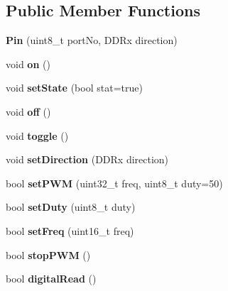 \subsection*{Public Member Functions}
\begin{DoxyCompactItemize}
\item 
\mbox{\label{classPin_a5a77b8b0c99771c11582f0a011496e6b}} 
{\bfseries Pin} (uint8\+\_\+t port\+No, D\+D\+Rx direction)
\item 
\mbox{\label{classPin_ae562d4913700a9af64086bc0bad95a28}} 
void {\bfseries on} ()
\item 
\mbox{\label{classPin_a2488d5db01d0bae6d5fe8932b39d3bbe}} 
void {\bfseries set\+State} (bool stat=true)
\item 
\mbox{\label{classPin_aa568e83b313f1b9f66bb50f66f18e62c}} 
void {\bfseries off} ()
\item 
\mbox{\label{classPin_a5ecffd86fb366af5ff559faf82a1fc81}} 
void {\bfseries toggle} ()
\item 
\mbox{\label{classPin_a49a4bc8df0fad82b4799fa19da708f12}} 
void {\bfseries set\+Direction} (D\+D\+Rx direction)
\item 
\mbox{\label{classPin_ae3b0862a7ec9b11f7a8986024669e25a}} 
bool {\bfseries set\+P\+WM} (uint32\+\_\+t freq, uint8\+\_\+t duty=50)
\item 
\mbox{\label{classPin_a938a229474b8319ced9edbad488d6157}} 
bool {\bfseries set\+Duty} (uint8\+\_\+t duty)
\item 
\mbox{\label{classPin_a8610548d2ab0b531e4e0697ca09aeb0c}} 
bool {\bfseries set\+Freq} (uint16\+\_\+t freq)
\item 
\mbox{\label{classPin_a4ea18c4f3780b3af59406be5d0b5a176}} 
bool {\bfseries stop\+P\+WM} ()
\item 
\mbox{\label{classPin_ae04006b8dc5d6fb25ff4e2a781ba047d}} 
bool {\bfseries digital\+Read} ()
\item 
\mbox{\label{classPin_ac678e5fd7f7bc33260eb909178e17367}} 

\end{DoxyCompactItemize}
